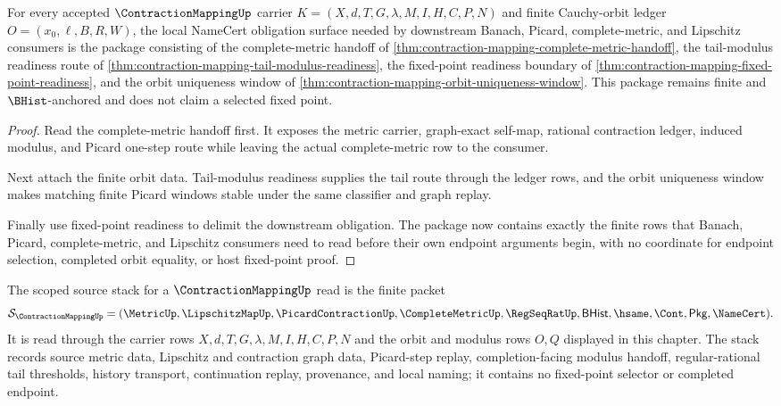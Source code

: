 \begin{theorem}
\label{thm:contraction-mapping-complete-metric-consumer-package}
For every accepted $\ContractionMappingUp$ carrier $K=(X,d,T,G,\lambda,M,I,H,C,P,N)$ and finite Cauchy-orbit ledger $O=(x_0,\ell,B,R,W)$, the local NameCert obligation surface needed by downstream Banach, Picard, complete-metric, and Lipschitz consumers is the package consisting of the complete-metric handoff of \autoref{thm:contraction-mapping-complete-metric-handoff}, the tail-modulus readiness route of \autoref{thm:contraction-mapping-tail-modulus-readiness}, the fixed-point readiness boundary of \autoref{thm:contraction-mapping-fixed-point-readiness}, and the orbit uniqueness window of \autoref{thm:contraction-mapping-orbit-uniqueness-window}. This package remains finite and $\BHist$-anchored and does not claim a selected fixed point.
\end{theorem}
\begin{proof}
Read the complete-metric handoff first. It exposes the metric carrier, graph-exact self-map, rational contraction ledger, induced modulus, and Picard one-step route while leaving the actual complete-metric row to the consumer.

Next attach the finite orbit data. Tail-modulus readiness supplies the tail route through the ledger rows, and the orbit uniqueness window makes matching finite Picard windows stable under the same classifier and graph replay.

Finally use fixed-point readiness to delimit the downstream obligation. The package now contains exactly the finite rows that Banach, Picard, complete-metric, and Lipschitz consumers need to read before their own endpoint arguments begin, with no coordinate for endpoint selection, completed orbit equality, or host fixed-point proof.
\end{proof}

\begin{definition}
\label{def:contraction-mapping-scoped-source-stack}
The scoped source stack for a $\ContractionMappingUp$ read is the finite packet
$$
\mathcal S_{\ContractionMappingUp}
=(\MetricUp,\LipschitzMapUp,\PicardContractionUp,\CompleteMetricUp,\RegSeqRatUp,\mathsf{BHist},\hsame,\Cont,\mathsf{Pkg},\NameCert).
$$
It is read through the carrier rows $X,d,T,G,\lambda,M,I,H,C,P,N$ and the orbit and modulus rows $O,Q$ displayed in this chapter. The stack records source metric data, Lipschitz and contraction graph data, Picard-step replay, completion-facing modulus handoff, regular-rational tail thresholds, history transport, continuation replay, provenance, and local naming; it contains no fixed-point selector or completed endpoint.
\end{definition}

